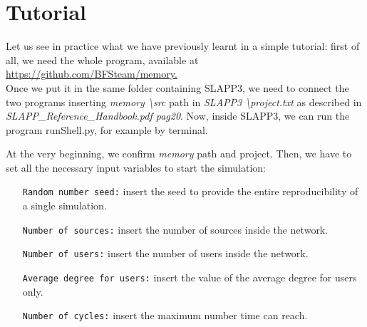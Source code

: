 \section{Tutorial}
Let us see in practice what we have previously learnt in a simple tutorial: first of all, we need the whole program, available at \url{https://github.com/BFSteam/memory.}\\
Once we put it in the same folder containing SLAPP3, we need to connect the two programs inserting \textit{memory \textbackslash src} path in \textit{SLAPP3 \textbackslash project.txt} as described in 
\\ \textit{SLAPP\_Reference\_Handbook.pdf pag20}.
Now, inside SLAPP3, we can run the program runShell.py, for example by terminal.

At the very beginning, we confirm \textit{memory} path and project. Then, we have to set all the necessary input variables to start the simulation:
\begin{itemize}
\item[\texttt{Random number seed:}] insert the seed to provide the entire reproducibility of a single simulation.
\item[\texttt{Number of sources:}]insert the number of sources inside the network.
\item[\texttt{Number of users:}]insert the number of users inside the network.
\item[\texttt{Average degree for users:}]insert the value of the average degree for users only.
\item[\texttt{Number of cycles:}]insert the maximum number time can reach.
\end{itemize}

